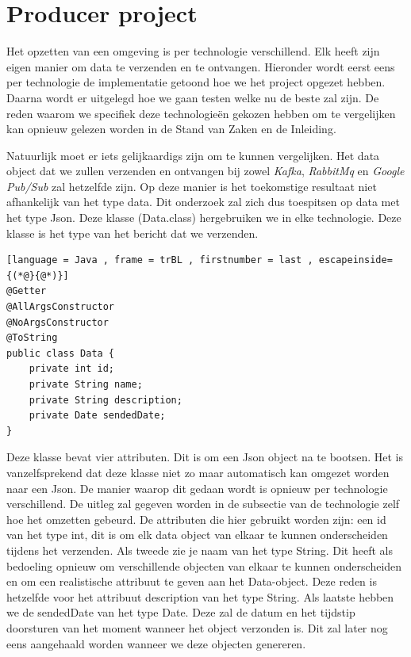 \section{Producer project}
Het opzetten van een omgeving is per technologie verschillend. Elk heeft zijn eigen manier om data te verzenden en te ontvangen. Hieronder wordt eerst eens per technologie de implementatie getoond hoe we het project opgezet hebben. Daarna wordt er uitgelegd hoe we gaan testen welke nu de beste zal zijn. De reden waarom we specifiek deze technologieën gekozen hebben om te vergelijken kan opnieuw gelezen worden in de Stand van Zaken en de Inleiding.  

Natuurlijk moet er iets gelijkaardigs zijn om te kunnen vergelijken. Het data object dat we zullen verzenden en ontvangen bij zowel \emph{Kafka}, \emph{RabbitMq} en \emph{Google Pub/Sub} zal hetzelfde zijn. Op deze manier is het toekomstige resultaat niet afhankelijk van het type data. Dit onderzoek zal zich dus toespitsen op data met het type Json. Deze klasse (Data.class) hergebruiken we in elke technologie. Deze klasse is het type van het bericht dat we verzenden.
\begin{lstlisting}[language = Java , frame = trBL , firstnumber = last , escapeinside={(*@}{@*)}]
@Getter
@AllArgsConstructor
@NoArgsConstructor
@ToString
public class Data {
    private int id;
    private String name;
    private String description;
    private Date sendedDate;
}
     \end{lstlisting}
     
Deze klasse bevat vier attributen. Dit is om een Json object na te bootsen. Het is vanzelfsprekend dat deze klasse niet zo maar automatisch kan omgezet worden naar een Json. De manier waarop dit gedaan wordt is opnieuw per technologie verschillend. De uitleg zal gegeven worden in de subsectie van de technologie zelf hoe het omzetten gebeurd. De attributen die hier gebruikt worden zijn: een id van het type int, dit is om elk data object van elkaar te kunnen onderscheiden tijdens het verzenden. Als tweede zie je naam van het type String. Dit heeft als bedoeling opnieuw om verschillende objecten van elkaar te kunnen onderscheiden en om een realistische attribuut te geven aan het Data-object. Deze reden is hetzelfde voor het attribuut description van het type String. Als laatste hebben we de sendedDate van het type Date. Deze zal de datum en het tijdstip doorsturen van het moment wanneer het object verzonden is. Dit zal later nog eens aangehaald worden wanneer we deze objecten genereren. 

